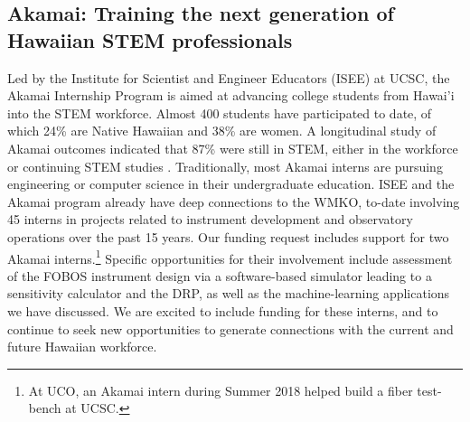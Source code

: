 \documentclass[oneside,11pt]{amsart}
\begin{document}
\subsection{Akamai: Training the next generation of Hawaiian STEM
professionals} Led by the Institute for Scientist and Engineer Educators
(ISEE) at UCSC, the Akamai Internship Program is aimed at advancing
college students from Hawai'i into the STEM workforce.  Almost 400
students have participated to date, of which 24\% are Native Hawaiian
and 38\% are women. A longitudinal study of Akamai outcomes indicated
that 87\% were still in STEM, either in the workforce or continuing STEM
studies \citep{asee_peer_31030}.  Traditionally, most Akamai interns are
pursuing engineering or computer science in their undergraduate
education.  ISEE and the Akamai program already have deep connections to
the WMKO, to-date involving 45 interns in projects related to instrument
development and observatory operations over the past 15 years.  Our
funding request includes support for two Akamai interns.\footnote{
%
At UCO, an Akamai intern during Summer 2018 helped build a fiber
test-bench at UCSC.}
%
Specific opportunities for their involvement include assessment of the
FOBOS instrument design via a software-based simulator leading to a
sensitivity calculator and the DRP, as well as the machine-learning
applications we have discussed.  We are excited to include funding for
these interns, and to continue to seek new opportunities to generate
connections with the current and future Hawaiian workforce.

\end{document}
